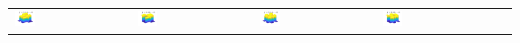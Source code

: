 \documentclass[11pt,compress,xcolor={usenames,dvipsnames},aspectratio=169]{beamer}
\begin{document}
\begin{frame}
\begin{tabular}{>{\centering}m{}>{\centering}m{}>{\centering}m{}>{\centering}m{}>{\centering}m{}}
\includegraphics[width =0.18\textwidth]{ProgramsImages/Walsh_Degree_1_2.png}  &
\includegraphics[width =0.18\textwidth]{ProgramsImages/Walsh_Degree_1_3.png}  &
\includegraphics[width =0.18\textwidth]{ProgramsImages/Walsh_Degree_2_2.png}  &
\includegraphics[width =0.18\textwidth]{ProgramsImages/Walsh_Degree_2_3.png} 
	\end{tabular}
\end{frame}
\end{document}
